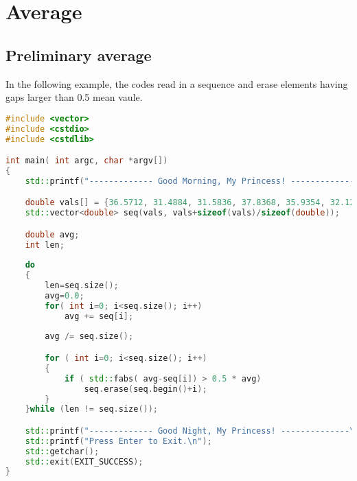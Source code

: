 
\chapter{Average}
\section{Preliminary average}
In the following example, the codes read in a sequence and erase elements having gaps larger than 0.5 mean vaule. 
\begin{lstlisting}[language=C++]
#include <vector>
#include <cstdio>
#include <cstdlib>

int main( int argc, char *argv[])
{
	std::printf("------------- Good Morning, My Princess! --------------\n");

	double vals[] = {36.5712, 31.4884, 31.5836, 37.8368, 35.9354, 32.1255, 160.409, 32.1387, 36.573, 35.3065, 36.561, 37.8515, 142.834, 37.8465, 220.383, 31.5854};
	std::vector<double> seq(vals, vals+sizeof(vals)/sizeof(double));

	double avg;
	int len;
	
	do
	{
		len=seq.size();
		avg=0.0;
		for( int i=0; i<seq.size(); i++)
			avg += seq[i];
	
		avg /= seq.size();

		for ( int i=0; i<seq.size(); i++)
		{
			if ( std::fabs( avg-seq[i]) > 0.5 * avg)
				seq.erase(seq.begin()+i);
		}
	}while (len != seq.size());

	std::printf("------------- Good Night, My Princess! --------------\n");
	std::printf("Press Enter to Exit.\n");
	std::getchar();
	std::exit(EXIT_SUCCESS);
}
\end{lstlisting}

